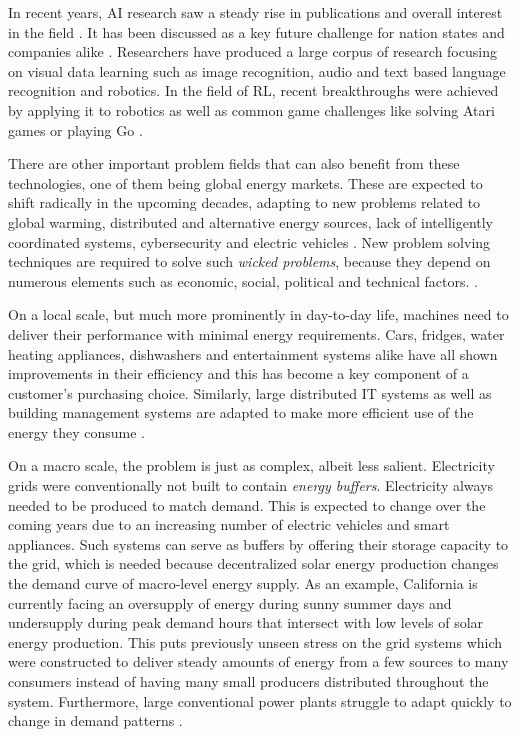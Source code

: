 
In recent years, \ac{AI} research saw a steady rise in publications and overall interest in the field
\cite[]{arulkumaran2017brief, russell2016artificial}.
It has been discussed as a key future challenge for nation states and companies alike
\cite[]{mozur_markoff_2017, faznetchina_2018}. Researchers have produced a large corpus of research focusing on visual
data learning such as image recognition, audio and text based language recognition and robotics. In the field of
\ac{RL}, recent breakthroughs were achieved by applying it to robotics as well as common game challenges like solving Atari games or
playing Go
\cite[]{arulkumaran2017brief}.

There are other important problem fields that can also benefit from these technologies, one of them being global energy markets.
These are expected to shift radically in the upcoming decades, adapting to new problems related to global warming,
distributed and alternative energy sources, lack of intelligently coordinated systems, cybersecurity  and electric vehicles \cite[p.10ff.]{mitei2011}. New problem solving techniques are required to solve such \emph{wicked problems}, because
they depend on numerous elements such as economic, social, political and technical factors.
\cite[]{ketter2015competitive}.

On a local scale, but much more prominently in day-to-day life, machines need to deliver their performance with minimal energy requirements. Cars, fridges, water heating
appliances, dishwashers and entertainment systems alike have all shown improvements in their efficiency and this has
become a key component of a customer's purchasing choice.  Similarly, large distributed IT systems as well as building
management systems are adapted to make more efficient use of the energy they consume
\cite[]{Orgerie:2014:STI:2597757.2532637, DePaola:2014:IMS:2620784.2611779}.

On a macro scale, the problem is just as complex, albeit less salient.  Electricity grids were conventionally not built
to contain \emph{energy buffers}. Electricity always needed to be produced to match demand. This is expected to change
over the coming years due to an increasing number of electric vehicles and smart appliances. Such systems can serve as buffers
by offering their storage capacity to the grid, which is needed because decentralized
solar energy production changes the demand curve of macro-level energy supply. As an example, California is currently
facing an
oversupply of energy during sunny summer days and undersupply during peak demand hours that intersect with low levels of
solar energy production. This puts previously unseen stress on the grid systems which were constructed to deliver steady amounts
of energy from a few sources to many consumers instead of having many small producers distributed throughout the system.
Furthermore, large conventional power plants struggle to adapt quickly to change in demand patterns
\cite[]{roberts_2016}.

